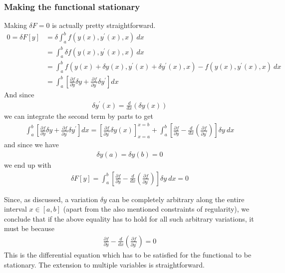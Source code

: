 \documentclass[a4paper]{article}
\begin{document}
    \subsubsection{Making the functional stationary}
    Making \(\delta F = 0\) is actually pretty straightforward. \begin{align*}
        0 = \delta F[y] &= \delta \int_a ^b f(y(x), y^{\prime} (x), x) \ dx \\
        &= \int_a ^b \delta f(y(x), y^{\prime} (x), x)\ dx\\
        &= \int _a ^b f(y(x) + \delta y(x), y^{\prime} (x) + \delta y^{\prime} (x), x) - f(y(x), y^{\prime} (x), x)\ dx\\
        &= \int_a ^b \left[ \frac{\partial f}{\partial y} \delta y + \frac{\partial f}{\partial y^{\prime} }\delta y^{\prime} \right]dx
    \end{align*} 
    And since \begin{align*}
        \delta y^{\prime} (x) = \frac{d}{dx}\left(\delta y(x)\right)
    \end{align*}
    we can integrate the second term by parts to get \begin{align*}
        \int_a ^b \left[ \frac{\partial f}{\partial y} \delta y + \frac{\partial f}{\partial y^{\prime} }\delta y^{\prime} \right]dx = \left[\frac{\partial f}{\partial y^{\prime} }\delta y(x)\right]_{x = a}^{x = b} + \int _a ^b \left[ \frac{\partial f}{\partial y}- \frac{d}{dx}\left( \frac{\partial f}{\partial y^{\prime}}\right)\right]\delta y\  dx
    \end{align*}
    and since we have \begin{align*}
        \delta y (a) = \delta y (b) = 0
    \end{align*}
    we end up with 
    \begin{align*}
        \delta F[y] = \int _a ^b \left[ \frac{\partial f}{\partial y}- \frac{d}{dx}\left( \frac{\partial f}{\partial y^{\prime}}\right)\right]\delta y\  dx = 0
    \end{align*}

    Since, as discussed, a variation \(\delta y\) can be completely arbitrary along the entire interval \(x \in [a, b]\) (apart from the also mentioned constraints of regularity), we conclude that if the above equality has to hold for all such arbitrary variations, it must be because 
    \begin{align*}
        \frac{\partial f}{\partial y}- \frac{d}{dx}\left( \frac{\partial f}{\partial y^{\prime}}\right) = 0
    \end{align*}
    This is the differential equation which has to be satisfied for the functional to be stationary. The extension to multiple variables is straightforward. 
\end{document}

